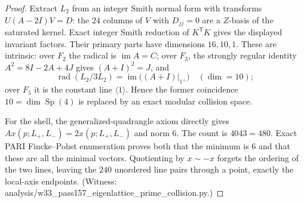 \documentclass[12pt,a4paper]{article}
\def\mathbb#1{#1}%
\def\mathbf#1{#1}%
\def\texttt#1{#1}%
\def\cdot{ }%
\theoremstyle{definition}
\begin{document}
\begin{proof}
Extract $L_2$ from an integer Smith normal form with transforms
$U(A-2I)V=D$: the $24$ columns of $V$ with $D_{jj}=0$ are a $\mathbb Z$-basis
of the saturated kernel. Exact integer Smith reduction of
$K^{\mathsf T}K$ gives the displayed invariant factors. Their primary parts
have dimensions $16,10,1$. These are intrinsic: over $\mathbb F_2$ the
radical is $\operatorname{im}A=C$; over $\mathbb F_3$, the strongly regular
identity $A^2=8I-2A+4J$ gives $(A+I)^2=J$, and
\[
 \operatorname{rad}(L_2/3L_2)
 =\operatorname{im}\bigl((A+I)|_{\mathbf1^\perp}\bigr)
 \quad(\dim=10);
\]
over $\mathbb F_5$ it is the constant line $\langle\mathbf1\rangle$. Hence
the former coincidence $10=\dim\operatorname{Sp}(4)$ is replaced by an exact
modular collision space.

For the shell, the generalized-quadrangle axiom directly gives
$Ax(p;L_+,L_-)=2x(p;L_+,L_-)$ and norm $6$. The count is
$40\cdot4\cdot3=480$. Exact PARI Fincke--Pohst enumeration proves both that
the minimum is $6$ and that these are all the minimal vectors. Quotienting by
$x\sim-x$ forgets the ordering of the two lines, leaving the $240$ unordered
line pairs through a point, exactly the local-axis endpoints. (Witness:
\texttt{analysis/w33\_pass157\_eigenlattice\_prime\_collision.py}.)
\end{proof}
\end{document}
